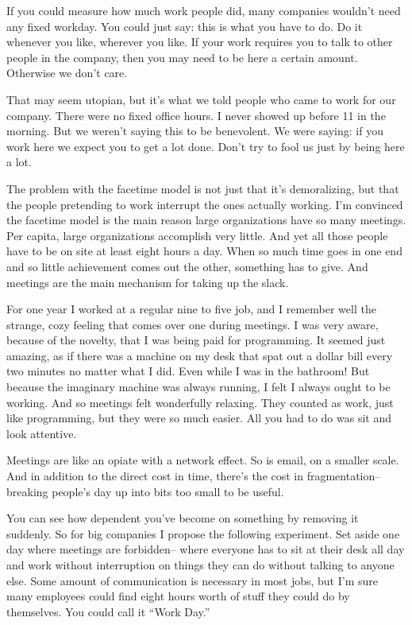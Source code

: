 If you could measure how much work people did, many companies wouldn't
need any fixed workday. You could just say: this is what you have to do.
Do it whenever you like, wherever you like. If your work requires you to
talk to other people in the company, then you may need to be here a
certain amount. Otherwise we don't care.

That may seem utopian, but it's what we told people who came to work for
our company. There were no fixed office hours. I never showed up before
11 in the morning. But we weren't saying this to be benevolent. We were
saying: if you work here we expect you to get a lot done. Don't try to
fool us just by being here a lot.

The problem with the facetime model is not just that it's demoralizing,
but that the people pretending to work interrupt the ones actually
working. I'm convinced the facetime model is the main reason large
organizations have so many meetings. Per capita, large organizations
accomplish very little. And yet all those people have to be on site at
least eight hours a day. When so much time goes in one end and so little
achievement comes out the other, something has to give. And meetings are
the main mechanism for taking up the slack.

For one year I worked at a regular nine to five job, and I remember well
the strange, cozy feeling that comes over one during meetings. I was
very aware, because of the novelty, that I was being paid for
programming. It seemed just amazing, as if there was a machine on my
desk that spat out a dollar bill every two minutes no matter what I did.
Even while I was in the bathroom! But because the imaginary machine was
always running, I felt I always ought to be working. And so meetings
felt wonderfully relaxing. They counted as work, just like programming,
but they were so much easier. All you had to do was sit and look
attentive.

Meetings are like an opiate with a network effect. So is email, on a
smaller scale. And in addition to the direct cost in time, there's the
cost in fragmentation-- breaking people's day up into bits too small to
be useful.

You can see how dependent you've become on something by removing it
suddenly. So for big companies I propose the following experiment. Set
aside one day where meetings are forbidden-- where everyone has to sit
at their desk all day and work without interruption on things they can
do without talking to anyone else. Some amount of communication is
necessary in most jobs, but I'm sure many employees could find eight
hours worth of stuff they could do by themselves. You could call it
``Work Day.''

